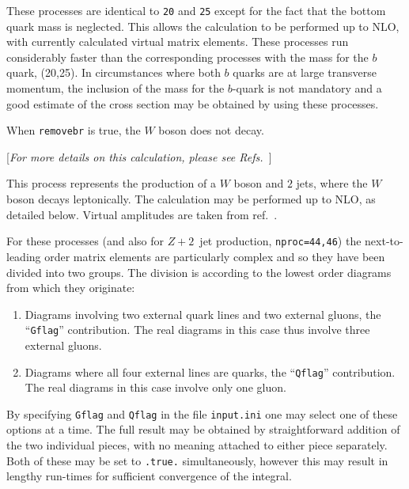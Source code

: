\label{subsec:wbbmassless}

These processes are identical to {\tt 20} and {\tt 25} except for the fact
that the bottom quark mass is neglected. This allows the calculation to be
performed up to NLO, with currently calculated virtual matrix elements. These 
processes run considerably faster than the corresponding processes with the mass
for the $b$ quark, (20,25). In circumstances where both $b$ quarks are at large 
transverse momentum, the inclusion of the mass for the $b$-quark is not mandatory
and a good estimate of the cross section may be obtained by using these processes.

When {\tt removebr} is true, the $W$ boson does not decay.

\label{subsec:w2jets}

\begin{center}
[{\it For more details on this calculation, please see Refs.~\cite{Campbell:2002tg,Campbell:2003hd}}]
\end{center}

This process represents the production of a $W$ boson and $2$ jets,
where the $W$ boson decays leptonically. The calculation may be
performed up to NLO, as detailed below. Virtual amplitudes are
taken from ref.~\cite{Bern:1997sc}.

For these processes (and also for $Z+2$~jet production, {\tt nproc=44,46})
the next-to-leading order matrix elements are
particularly complex and so they have been divided into two groups.
The division is according to the lowest order diagrams from which they
originate:
\begin{enumerate}
\item Diagrams involving two external quark lines and two external gluons,
the ``{\tt Gflag}'' contribution. The real diagrams in this case thus
involve three external gluons.

\item Diagrams where all four external lines are quarks,
the ``{\tt Qflag}'' contribution. The real diagrams in this case 
involve only one gluon.
\end{enumerate}

By specifying {\tt Gflag} and {\tt Qflag} in the file {\tt input.ini} one may
select one of these options at a time. The full result may be obtained
by straightforward addition of the two individual pieces, with no
meaning attached to either piece separately. 
Both of these may be set to {\tt .true.} simultaneously, however this
may result in lengthy run-times for sufficient convergence of the integral.


